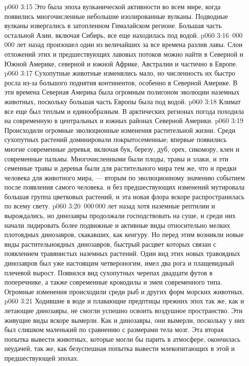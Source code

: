 \vs p060 3:15 Это была эпоха вулканической активности во всем мире, когда появились многочисленные небольшие изолированные вулканы. Подводные вулканы извергались в затопленном Гималайском регионе. Большая часть остальной Азии, включая Сибирь, все еще находилась под водой.
\vs p060 3:16 \,000\,000 лет назад произошел один из величайших за все времена разлив лавы. Слои отложений этих и предшествующих лавовых потоков можно найти в Северной и Южной Америке, северной и южной Африке, Австралии и частично в Европе.
\vs p060 3:17 Сухопутные животные изменялись мало, но численность их быстро росла из\hyp{}за большого поднятия континентов, особенно в Северной Америке. В эти времена Северная Америка была огромным полигоном эволюции наземных животных, поскольку большая часть Европы была под водой.
\vs p060 3:18 Климат все еще был теплым и единообразным. В арктических регионах погода походила на современную в центральных и южных районах Северной Америки.
\vs p060 3:19 Происходили огромные эволюционные изменения растительной жизни. Среди сухопутных растений доминировали покрытосеменные; впервые появились многие современные деревья, включая бук, березу, дуб, орех, сикомору, клен и современные пальмы. Многочисленными были плоды, травы и злаки, и эти семенные травы и деревья были для растительного мира тем же, что и предки человека для животного мира, --- вторым по эволюционному значению событием после появления самого человека.  и без предшествующих изменений мутировала большая группа цветковых растений, и эта новая флора вскоре распространилась по всему свету.
\vs p060 3:20 \,000\,000 лет назад хотя наземные рептилии и вырождались, но динозавры продолжали господствовать на суше, и среди них начали лидировать более подвижные и активные виды относительно мелких плотоядных динозавров, скакавших, как кенгуру. Но перед этим возникли новые виды растительноядных динозавров, быстрый расцвет которых связан с появлением травянистых наземных растений. Один вид этих новых травоядных динозавров был уже настоящим четвероногим, имел два рога и плащевидный плечевой вырост. Появился вид сухопутных черепах двадцати футов в поперечнике, а также современные крокодилы и змеи современного типа. Огромные изменения происходили среди рыб и других форм морских животных.
\vs p060 3:21 Ходившие в воде и плавающие предптицы прежних эпох так же, как и летающие динозавры, не смогли успешно освоить воздушное пространство. Эти живущие виды вскоре вымерли. Как и динозавры, они вымерли, поскольку у них был слишком маленький по сравнению с размерами тела мозг. Эта вторая попытка вывести животных, которые могли бы парить в атмосфере, окончилась неудачей, так же, как безуспешная попытка вывести млекопитающих в этой и предшествующей эпохах.
